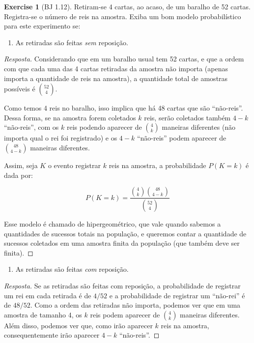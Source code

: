 \documentclass[
]{article}
\providecommand{\tightlist}{%
  \setlength{\itemsep}{0pt}\setlength{\parskip}{0pt}}
\theoremstyle{definition}
\theoremstyle{definition}
\theoremstyle{definition}
\newtheorem{exercise}{Exercise}[section]
\theoremstyle{definition}
\theoremstyle{remark}
\begin{document}
\begin{exercise}[BJ 1.12]

Retiram-se 4 cartas, ao acaso, de um baralho de 52 cartas. Registra-se o número de reis na amostra. Exiba um bom modelo probabilístico para este experimento se:

\begin{enumerate}
\def\labelenumi{\alph{enumi})}
\tightlist
\item
  As retiradas são feitas \emph{sem} reposição.
\end{enumerate}

\begin{proof}[Resposta]
Considerando que em um baralho usual tem 52 cartas, e que a ordem com que cada uma das 4 cartas retiradas da amostra não importa (apenas importa a quantidade de reis na amostra), a quantidade total de amostras possíveis é \(\binom{52}{4}\).

Como temos 4 reis no baralho, isso implica que há 48 cartas que são ``não-reis''. Dessa forma, se na amostra forem coletados \(k\) reis, serão coletados também \(4-k\) ``não-reis'', com os \(k\) reis podendo aparecer de \(\binom{4}{k}\) maneiras diferentes (não importa qual o rei foi registrado) e os \(4-k\) ``não-reis'' podem aparecer de \(\binom{48}{4-k}\) maneiras diferentes.

Assim, seja \(K\) o evento registrar \(k\) reis na amostra, a probabilidade \(P(K=k)\) é dada por:

\begin{equation}
P(K=k) = \frac{\binom{4}{k}\binom{48}{4-k}}{\binom{52}{4}}
\label{eq:hgeomex}
\end{equation}

Esse modelo é chamado de hipergeométrico, que vale quando sabemos a quantidades de sucessos totais na população, e queremos contar a quantidade de sucessos coletados em uma amostra finita da população (que também deve ser finita).
\end{proof}

\begin{enumerate}
\def\labelenumi{\alph{enumi})}
\setcounter{enumi}{1}
\tightlist
\item
  As retiradas são feitas \emph{com} reposição.
\end{enumerate}

\begin{proof}[Resposta]
Se as retiradas são feitas com reposição, a probabilidade de registrar um rei em cada retirada é de \(4/52\) e a probabilidade de registrar um ``não-rei'' é de \(48/52\). Como a ordem das retiradas não importa, podemos ver que em uma amostra de tamanho 4, os \(k\) reis podem aparecer de \(\binom{4}{k}\) maneiras diferentes. Além disso, podemos ver que, como irão aparecer \(k\) reis na amostra, consequentemente irão aparecer \(4-k\) ``não-reis''.


\end{proof}
\end{exercise}
\end{document}
